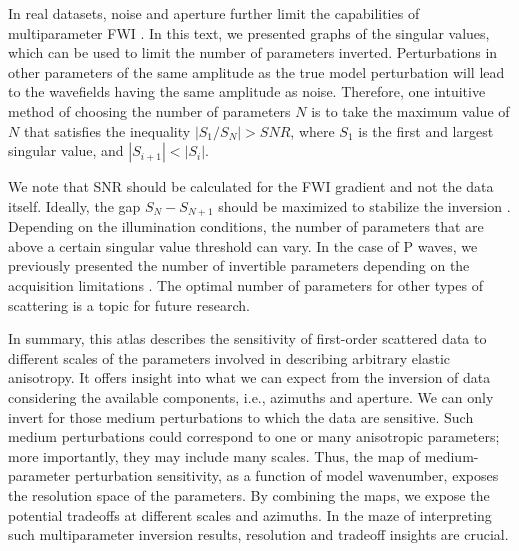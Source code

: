 In real datasets, noise and aperture further limit the capabilities of multiparameter FWI \citep{masmoudi2018, oh2018}. In this text, we presented graphs of the singular values, which can be used to limit the number of parameters inverted.
Perturbations in other parameters of the same amplitude as the true model perturbation will lead to the wavefields having the same amplitude as noise. Therefore, one intuitive method of choosing the number of parameters $N$ is to take the maximum value of $N$ that satisfies the inequality $|S_{1}/S_{N}| > SNR$, where $S_{1}$ is the first and largest singular value, and $|S_{i+1}|<|S_{i}|$.

We note that SNR should be calculated for the FWI gradient and not the data itself. Ideally, the gap $S_{N}-S_{N+1}$ should be maximized to stabilize the inversion \citep{cheverda1995, kazei2018}.  
Depending on the illumination conditions, the number of parameters that are above a certain singular value threshold can vary. In the case of P waves, we previously presented the number of invertible parameters depending on the acquisition limitations \citep{kazei2018}. The optimal number of parameters for other types of scattering is a topic for future research.

In summary, this atlas describes the sensitivity of first-order scattered data to different scales of the parameters involved in describing arbitrary elastic anisotropy. It offers insight into what we can expect from the inversion of data considering the available components, i.e., azimuths and aperture. We can only invert for those medium perturbations to which the data are sensitive. Such medium perturbations could correspond to one or many anisotropic parameters; more importantly, they may include many scales. Thus, the map of medium-parameter perturbation sensitivity, as a function of model wavenumber, exposes the resolution space of the parameters. By combining the maps, we expose the potential tradeoffs at different scales and azimuths. In the maze of interpreting such multiparameter inversion results, resolution and tradeoff insights are crucial.
